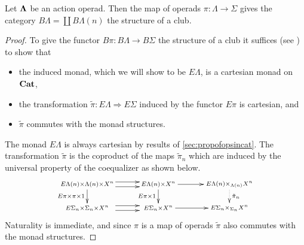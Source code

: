 \begin{thm}
Let $\mathbf{\Lambda}$ be an action operad. Then the map of operads $\pi \colon \Lambda \rightarrow \Sigma$ gives the category $B\Lambda = \coprod B\Lambda(n)$ the structure of a club.
\end{thm}
\begin{proof}
To give the functor $B\pi \colon B\Lambda \rightarrow B \Sigma$ the structure of a club it suffices (see \cite{leinster}) to show that
\begin{itemize}
\item the induced monad, which we will show to be $E\Lambda$, is a cartesian monad on $\mathbf{Cat}$,
\item the transformation $\tilde{\pi} \colon E\Lambda \Rightarrow E\Sigma$ induced by the functor $E\pi$ is cartesian, and
\item $\tilde{\pi}$ commutes with the monad structures.
\end{itemize}
The monad $E\Lambda$ is always cartesian by results of \cref{sec:propofopsincat}. The transformation $\tilde{\pi}$ is the coproduct of the maps $\tilde{\pi}_{n}$ which are induced by the universal property of the coequalizer as shown below.
  \[
    \xy
      (0,0)*+{\scriptstyle E\Lambda(n) \times \Lambda(n) \times X^n} ="00";
      (0,-10)*+{\scriptstyle E\Sigma_{n} \times \Sigma_{n} \times X^n} ="01";
      (30,0)*+{\scriptstyle E\Lambda(n) \times X^n} ="10";
      (30,-10)*+{\scriptstyle E\Sigma_{n} \times X^n} ="11";
      (60,0)*+{\scriptstyle E\Lambda(n) \times_{\Lambda(n)} X^n} ="20";
      (60,-10)*+{\scriptstyle E\Sigma_{n} \times_{\Sigma_{n}}  X^n} ="21";
      {\ar (12,1)*{}; (22,1)*{} };
      {\ar (12,-1)*{}; (22,-1)*{} };
      {\ar_{E\pi \times \pi \times 1} "00" ; "01"};
      {\ar (12,-9)*{}; (22,-9)*{} };
      {\ar (12,-11)*{}; (22,-11)*{} };
      {\ar_{E\pi \times 1} "10" ; "11"};
      {\ar@{.>}^{\tilde{\pi}_{n}} "20" ; "21"};
      {\ar "10" ; "20"};
      {\ar "11" ; "21"};
    \endxy
  \]
Naturality is immediate, and since $\pi$ is a map of operads $\tilde{\pi}$ also commutes with the monad structures.


\end{proof}
